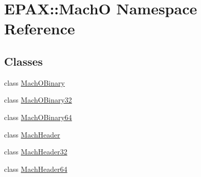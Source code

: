 \hypertarget{namespace_e_p_a_x_1_1_mach_o}{\section{\-E\-P\-A\-X\-:\-:\-Mach\-O \-Namespace \-Reference}
\label{namespace_e_p_a_x_1_1_mach_o}
}
\subsection*{\-Classes}
\begin{DoxyCompactItemize}
\item 
class \hyperlink{class_e_p_a_x_1_1_mach_o_1_1_mach_o_binary}{\-Mach\-O\-Binary}
\item 
class \hyperlink{class_e_p_a_x_1_1_mach_o_1_1_mach_o_binary32}{\-Mach\-O\-Binary32}
\item 
class \hyperlink{class_e_p_a_x_1_1_mach_o_1_1_mach_o_binary64}{\-Mach\-O\-Binary64}
\item 
class \hyperlink{class_e_p_a_x_1_1_mach_o_1_1_mach_header}{\-Mach\-Header}
\item 
class \hyperlink{class_e_p_a_x_1_1_mach_o_1_1_mach_header32}{\-Mach\-Header32}
\item 
class \hyperlink{class_e_p_a_x_1_1_mach_o_1_1_mach_header64}{\-Mach\-Header64}
\end{DoxyCompactItemize}
